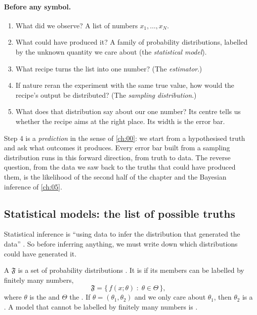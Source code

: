\paragraph{Before any symbol.}
\begin{enumerate}[label=\arabic*.]
  \item What did we observe? A list of numbers $x_1,\dots,x_N$.
  \item What could have produced it? A family of probability distributions,
        labelled by the unknown quantity we care about (the
        \emph{statistical model}).
  \item What recipe turns the list into one number? (The \emph{estimator}.)
  \item If nature reran the experiment with the same true value, how would the
        recipe's output be distributed? (The \emph{sampling distribution}.)
  \item What does that distribution say about our one number? Its centre tells
        us whether the recipe aims at the right place. Its width is the error bar.
\end{enumerate}

Step 4 is a \emph{prediction} in the sense of \cref{ch:00}: we start from a
hypothesised truth and ask what outcomes it produces. Every error bar built
from a sampling distribution runs in this forward direction, from truth to
data. The reverse question, from the data we saw back to the truths that
could have produced them, is the likelihood of the second half of the chapter
and the Bayesian inference of \cref{ch:05}.

\subsection{Statistical models: the list of possible truths}
\label{3a:sec:models}

Statistical inference is ``using data to infer the distribution that
generated the data'' . So before inferring anything, we must
write down which distributions could have generated it.

\begin{workdef}
A  $\mathfrak F$ is a set of probability
distributions . It is  if its members can be labelled by
finitely many numbers,
\begin{equation}
  \mathfrak F=\bigl\{\,f(x;\theta)\;:\;\theta\in\Theta\,\bigr\},
  \label{3a:eq:parametric-model}
\end{equation}
where $\theta$ is the   and $\Theta$ the 
. If $\theta=(\theta_1,\theta_2)$
and we only care about $\theta_1$, then $\theta_2$ is a  . A
model that cannot be labelled by finitely many numbers is
.
\end{workdef}

